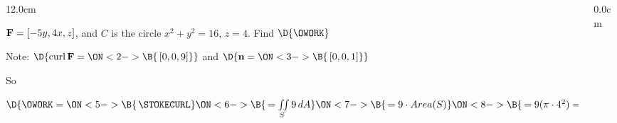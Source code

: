 \begin{frame}
\begin{columns}\begin{column}{12.0cm}
\scriptsize

\EX ${\bf F} = [-5y,4x,z]$, and $C$ is the circle $x^2 + y^2 = 16$, $z=4$. \quad Find $\D{\OWORK}$

\vspace{0.4cm}

Note:
$\D{
\text{curl}\, {\bf F} =
\ON<2->{\B{\, [0,0,9]}}}$ \quad and $\D{{\bf n} = 
\ON<3->{\B{\,[0,0,1]}}}$

\vspace{0.4cm}

So 

\vspace{0.4cm}

$\D{\OWORK = 
\ON<5->{\B{\,\STOKECURL}}
\ON<6->{\B{\, = \iint \limits_{S} 9\, dA}}
\ON<7->{\B{\, = 9 \cdot Area(S)}}
\ON<8->{\B{\, = 9 (\pi \cdot 4^2) = 144 \pi}}}$

\vspace{9.2cm}

\end{column}\begin{column}{0.0cm}\end{column}\end{columns}
\end{frame}

